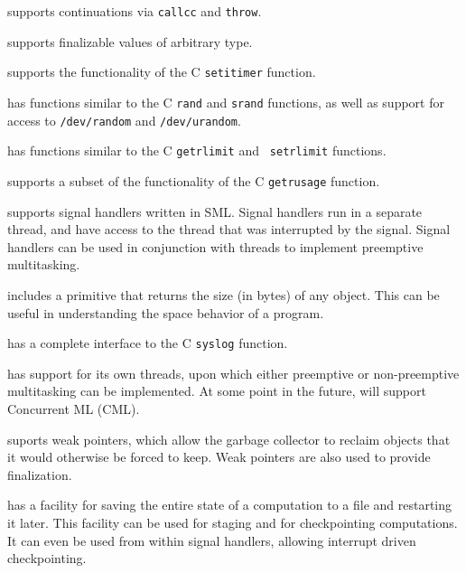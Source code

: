\begin{description}
\begin{description}

{\mlton} supports continuations via {\tt callcc} and {\tt throw}.

{\mlton} supports finalizable values of arbitrary type.

{\mlton} supports the functionality of the C {\tt setitimer} function.

{\mlton} has functions similar to the C {\tt rand} and {\tt srand} functions, as
well as support for access to {\tt /dev/random} and {\tt /dev/urandom}.

{\mlton} has functions similar to the C {\tt getrlimit} and {\tt
setrlimit} functions.

{\mlton} supports a subset of the functionality of the C {\tt getrusage}
function.

{\mlton} supports signal handlers written in SML.  Signal handlers run
in a separate {\mlton} thread, and have access to the thread that was
interrupted by the signal.  Signal handlers can be used in conjunction
with threads to implement preemptive multitasking.

{\mlton} includes a primitive that returns the size (in bytes) of any
object.  This can be useful in understanding the space behavior of a
program.

{\mlton} has a complete interface to the C {\tt syslog} function.

{\mlton} has support for its own threads, upon which either preemptive
or non-preemptive multitasking can be implemented.  At some point in
the future, {\mlton} will support Concurrent ML (CML).

{\mlton} suports weak pointers, which allow the garbage collector to
reclaim objects that it would otherwise be forced to keep.  Weak
pointers are also used to provide finalization.

{\mlton} has a facility for saving the entire state of a computation
to a file and restarting it later.  This facility can be used for
staging and for checkpointing computations.  It can even be used from
within signal handlers, allowing interrupt driven checkpointing.

\end{description}
\end{description}

